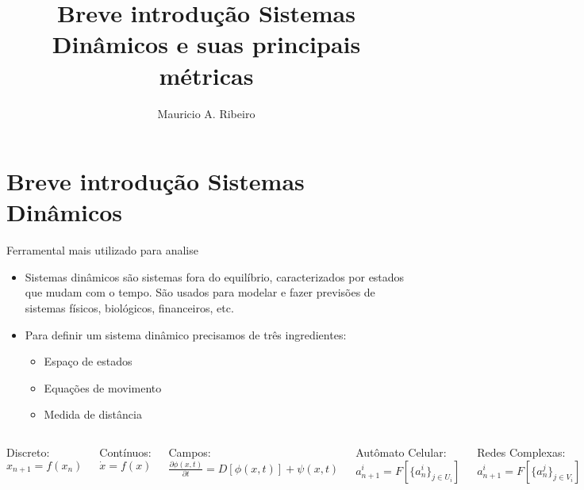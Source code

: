 \documentclass[12pt,aspectratio=169]{beamer}
\author[mau.ap.ribeiro@gmail.com]{Mauricio A. Ribeiro}
\title[Ribeiro, M. A.]{Breve introdução Sistemas Dinâmicos e suas principais métricas}
\institute[UTFPR-PG]{Universidade Tecnológica Federal do Paraná - Campus Ponta Grossa}
\begin{document}
\begin{frame}
\titlepage
\end{frame}

\begin{frame}
\tableofcontents
\end{frame}


\section{Breve introdução Sistemas Dinâmicos}
\begin{frame}{Ferramental mais utilizado para analise}
\begin{itemize}
    \item Sistemas dinâmicos são sistemas fora do equilíbrio, caracterizados por estados que mudam com o tempo. São usados para modelar e fazer previsões de sistemas físicos, biológicos, financeiros, etc.
    
    \item Para definir um sistema dinâmico precisamos de três ingredientes:
    \begin{itemize}
        \item Espaço de estados
        \item Equações de movimento
        \item Medida de distância 
    \end{itemize}
\end{itemize}
\end{frame}


\begin{frame}
\begin{columns}
\begin{block}{Discreto:}
$x_{n+1}=f(x_n)$
\end{block}
\begin{block}{ Contínuos:}
$\dot{x}=f(x)$
\end{block}
\begin{block}{ Campos:}
$\frac{\partial\phi(x,t)}{\partial t}=D[\phi(x,t)]+\psi(x,t)$
\end{block}
\begin{block}{  Autômato Celular:}
$a^{i}_{n+1}= F[\{a^i_n\}_{j\in U_i}]$
\end{block}
\begin{block}{ Redes Complexas: }
$a^{i}_{n+1} = F[\{a^{j}_{n}\}_{j \in V_i}]$
\end{block}
\end{columns}
\end{frame}
\end{document}
